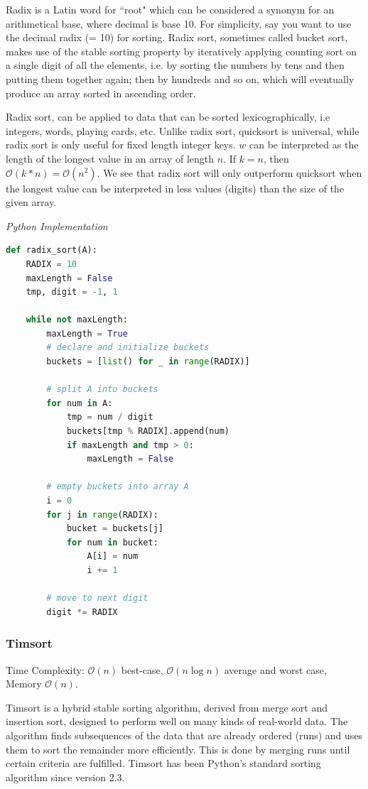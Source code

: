 \documentclass{article}
\newcommand{\bigO}{\mathcal{O}}
\begin{document}
    Radix is a Latin word for ``root" which can be considered a synonym for an arithmetical base, where decimal is base 10. For simplicity, say you want to use the decimal radix (= 10) for sorting. Radix sort, sometimes called bucket sort, makes use of the stable sorting property by iteratively applying counting sort on a single digit of all the elements, i.e. by sorting the numbers by tens and then putting them together again; then by hundreds and so on,  which will eventually produce an array sorted in ascending order. 
    
    Radix sort, can be applied to data that can be sorted lexicographically, i.e integers, words, playing cards, etc. Unlike radix sort, quicksort is universal, while radix sort is only useful for fixed length integer keys. $w$ can be interpreted as the length of the longest value in an array of length $n$. If $k = n$, then  $\bigO(k * n) = \bigO(n^2)$. We see that radix sort will only outperform quicksort when the longest value can be interpreted in less values (digits) than the size of the given array.
    
\vspace{8pt} \emph{Python Implementation}
\begin{lstlisting}[language=Python]
def radix_sort(A):
    RADIX = 10
    maxLength = False
    tmp, digit = -1, 1

    while not maxLength:
        maxLength = True
        # declare and initialize buckets
        buckets = [list() for _ in range(RADIX)]

        # split A into buckets
        for num in A:
            tmp = num / digit
            buckets[tmp % RADIX].append(num)
            if maxLength and tmp > 0:
                maxLength = False

        # empty buckets into array A
        i = 0
        for j in range(RADIX):
            bucket = buckets[j]
            for num in bucket:
                A[i] = num
                i += 1

        # move to next digit
        digit *= RADIX
\end{lstlisting}
    
    \subsubsection{Timsort}
    Time Complexity: $\bigO(n)$ best-case, $\bigO(n\log n)$  average and worst case, Memory $\bigO(n)$.
    
    Timsort is a hybrid stable sorting algorithm, derived from merge sort and insertion sort, designed to perform well on many kinds of real-world data. The algorithm finds subsequences of the data that are already ordered (runs) and uses them to sort the remainder more efficiently. This is done by merging runs until certain criteria are fulfilled. Timsort has been Python's standard sorting algorithm since version 2.3.
    
\end{document}
